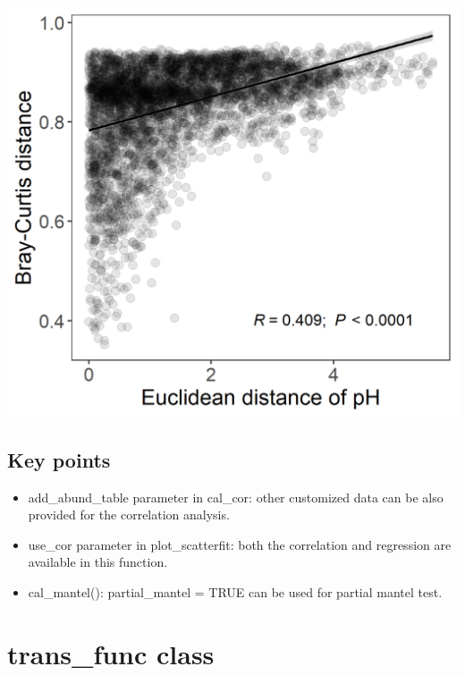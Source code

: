 \documentclass[
]{book}
\providecommand{\tightlist}{%
  \setlength{\itemsep}{0pt}\setlength{\parskip}{0pt}}
\begin{document}
\begin{center}\includegraphics[width=550px]{Images/plot_scatterfit_pHbray} \end{center}

\hypertarget{key-points-8}{%
\subsection{Key points}\label{key-points-8}}

\begin{itemize}
\tightlist
\item
  add\_abund\_table parameter in cal\_cor: other customized data can be also provided for the correlation analysis.
\item
  use\_cor parameter in plot\_scatterfit: both the correlation and regression are available in this function.
\item
  cal\_mantel(): partial\_mantel = TRUE can be used for partial mantel test.
\end{itemize}

\hypertarget{trans_func-class}{%
\section{trans\_func class}\label{trans_func-class}}
\end{document}
